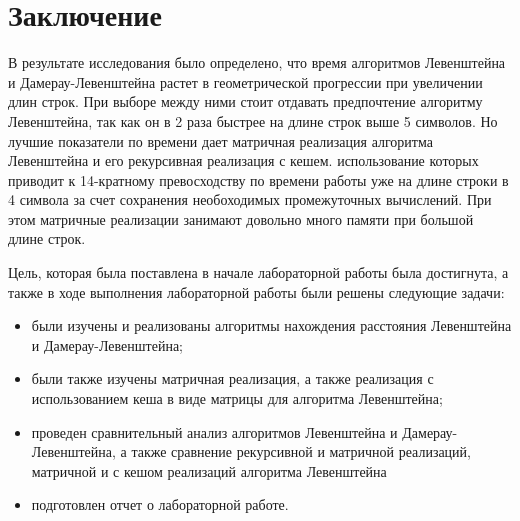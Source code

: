 \chapter*{Заключение}

В результате исследования было определено, что время алгоритмов Левенштейна и Дамерау-Левенштейна растет в геометрической прогрессии при увеличении длин строк. При выборе между ними стоит отдавать предпочтение алгоритму Левенштейна, так как он в 2 раза быстрее на длине строк выше 5 символов. Но лучшие показатели по времени дает матричная реализация алгоритма Левенштейна и его рекурсивная реализация с кешем. использование которых приводит к 14-кратному превосходству по времени работы уже на длине строки в 4 символа за счет сохранения необоходимых промежуточных вычислений. При этом матричные реализации занимают довольно много памяти при большой длине строк.


Цель, которая была поставлена в начале лабораторной работы была достигнута, а также в ходе выполнения лабораторной работы были решены следующие задачи:

\begin{itemize}
	\item были изучены и реализованы алгоритмы нахождения расстояния Левенштейна и Дамерау-Левенштейна;
	\item были также изучены матричная реализация, а также реализация с использованием кеша в виде матрицы для алгоритма Левенштейна;
    \item проведен сравнительный анализ алгоритмов Левенштейна и Дамерау-Левенштейна, а также сравнение рекурсивной и матричной реализаций, матричной и с кешом реализаций алгоритма Левенштейна
	\item подготовлен отчет о лабораторной работе.
\end{itemize}